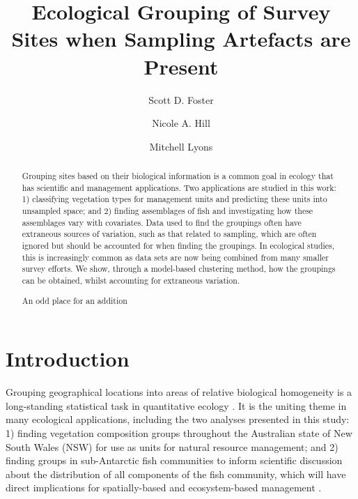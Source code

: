 \documentclass{statsoc}
\title[Grouping With Survey Artefacts]{Ecological Grouping of Survey Sites when Sampling Artefacts are Present}
\author[Foster, Hill \& Lyons]{Scott D. Foster}
\author{Nicole A. Hill}
\author[Foster, Hill \& Lyons]{Mitchell Lyons}
\begin{document}
\maketitle


\begin{abstract}
Grouping sites based on their biological information is a common goal in ecology that has scientific and management applications. Two applications are studied in this work: 1) classifying vegetation types for management units and predicting these units into unsampled space; and 2) finding assemblages of fish and investigating how these assemblages vary with covariates. Data used to find the groupings often have extraneous sources of variation, such as that related to sampling, which are often ignored but should be accounted for when finding the groupings. In ecological studies, this is increasingly common as data sets are now being combined from many smaller survey efforts. We show, through a model-based clustering method, how the groupings can be obtained, whilst accounting for extraneous variation.

An odd place for an addition

\end{abstract}


\maketitle

\section{Introduction}\label{s:intro}

Grouping geographical locations into areas of relative biological homogeneity is a long-standing statistical task in quantitative ecology \citep[e.g.][]{qui02,man04}. It is the uniting theme in many ecological applications, including the two analyses presented in this study: 1) finding vegetation composition groups throughout the Australian state of New South Wales (NSW) for use as units for natural resource management; and 2) finding groups in sub-Antarctic fish communities to inform scientific discussion about the distribution of all components of the fish community, which will have direct implications for spatially-based and ecosystem-based management \cite{con11}.
\end{document}
